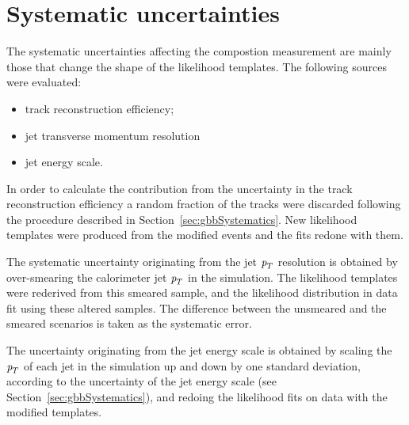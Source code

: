\section{Systematic uncertainties}\label{sec:FractionSystematics}

The systematic uncertainties affecting the compostion measurement are mainly those that change the shape of the likelihood templates. The following sources were evaluated:

\begin{itemize}\addtolength{\itemsep}{-0.4\baselineskip}
\item
track reconstruction efficiency;
\item
jet transverse momentum resolution 
\item
jet energy scale.
\end{itemize}


In order to calculate the contribution from the uncertainty in the track reconstruction efficiency a random fraction of the tracks were discarded following the procedure described in Section~\ref{sec:gbbSystematics}. New likelihood templates were produced from the modified events and the fits redone with them. 

The systematic uncertainty originating from the jet  ${\emph{p}_{T}}$ resolution is obtained by over-smearing the calorimeter jet ${\emph{p}_{T}}$ in the simulation. The likelihood templates were rederived from this smeared sample, and the likelihood distribution in data fit using these altered samples. The difference between the unsmeared and the smeared scenarios is taken as the systematic error. 

The uncertainty originating from the jet energy scale is obtained by scaling the ${\emph{p}_{T}}$ of each jet in the simulation up and down by one standard deviation, according to the uncertainty of the jet energy scale (see Section~\ref{sec:gbbSystematics}), and redoing the likelihood fits on data with the modified  %
templates.


